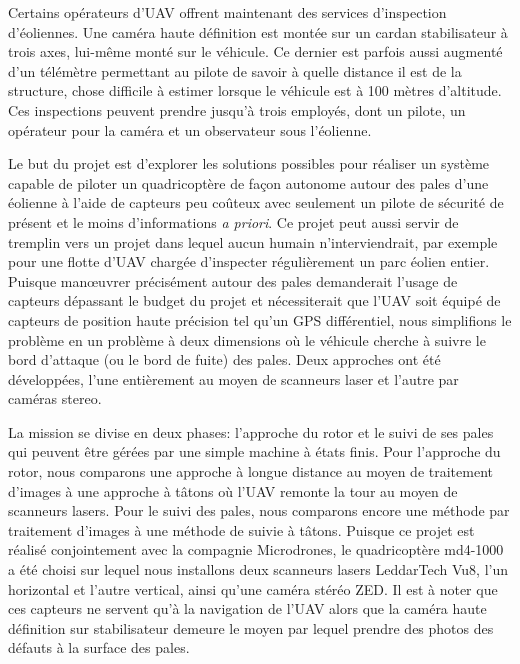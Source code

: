 Certains opérateurs d'UAV offrent maintenant des services d'inspection d'éoliennes. Une caméra haute définition est montée sur un cardan stabilisateur à trois axes, lui-même monté sur le véhicule. Ce dernier est parfois aussi augmenté d'un télémètre permettant au pilote de savoir à quelle distance il est de la structure, chose difficile à estimer lorsque le véhicule est à 100 mètres d'altitude. Ces inspections peuvent prendre jusqu'à trois employés, dont un pilote, un opérateur pour la caméra et un observateur sous l'éolienne.

Le but du projet est d'explorer les solutions possibles pour réaliser un système capable de piloter un quadricoptère de façon autonome autour des pales d'une éolienne à l'aide de capteurs peu coûteux avec seulement un pilote de sécurité de présent et le moins d'informations \emph{a priori}. Ce projet peut aussi servir de tremplin vers un projet dans lequel aucun humain n'interviendrait, par exemple pour une flotte d'UAV chargée d'inspecter régulièrement un parc éolien entier. Puisque man\oe uvrer précisément autour des pales demanderait l'usage de capteurs dépassant le budget du projet et nécessiterait que l'UAV soit équipé de capteurs de position haute précision tel qu'un GPS différentiel, nous simplifions le problème en un problème à deux dimensions où le véhicule cherche à suivre le bord d'attaque (ou le bord de fuite) des pales. Deux approches ont été développées, l'une entièrement au moyen de scanneurs laser et l'autre par caméras stereo.

La mission se divise en deux phases: l'approche du rotor et le suivi de ses pales qui peuvent être gérées par une simple machine à états finis. Pour l'approche du rotor, nous comparons une approche à longue distance au moyen de traitement d'images à une approche à tâtons où l'UAV remonte la tour au moyen de scanneurs lasers. Pour le suivi des pales, nous comparons encore une méthode par traitement d'images à une méthode de suivie à tâtons. Puisque ce projet est réalisé conjointement avec la compagnie Microdrones, le quadricoptère md4-1000 a été choisi sur lequel nous installons deux scanneurs lasers LeddarTech Vu8, l'un horizontal et l'autre vertical, ainsi qu'une caméra stéréo ZED. Il est à noter que ces capteurs ne servent qu'à la navigation de l'UAV alors que la caméra haute définition sur stabilisateur demeure le moyen par lequel prendre des photos des défauts à la surface des pales.

